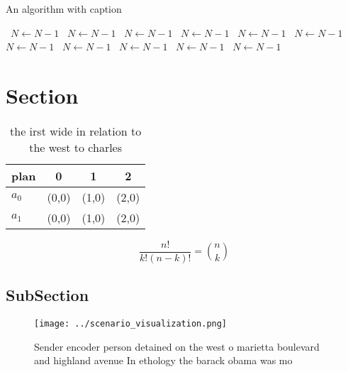 \documentclass[a4paper]{article}
\begin{document}
\begin{algorithm}
\caption{An algorithm with caption}
\begin{algorithmic}
\    \State $N \gets N - 1$
\    \State $N \gets N - 1$
\    \State $N \gets N - 1$
\    \State $N \gets N - 1$
\    \State $N \gets N - 1$
\    \State $N \gets N - 1$
\    \State $N \gets N - 1$
\    \State $N \gets N - 1$
\    \State $N \gets N - 1$
\    \State $N \gets N - 1$
\    \State $N \gets N - 1$
\EndWhile
\end{algorithmic}
\end{algorithm}

\section{Section}

\begin{table}
\begin{adjustbox}{width=0.6\columnwidth}
\begin{tabular}{|l|l|l|l|}
\hline
\textbf{plan} & \multicolumn{1}{c|}{\textbf{0}} & \multicolumn{1}{c|}{\textbf{1}} & \multicolumn{1}{c|}{\textbf{2}} \\ \hline
\textbf{$a_0$}  & (0,0) & (1,0) & (2,0) \\ \hline
\textbf{$a_1$}  & (0,0) & (1,0) & (2,0) \\ \hline
\end{tabular}
\end{adjustbox}
\caption{the irst wide in relation to the west to charles 
}
\end{table}

\[ \frac{n!}{k!(n-k)!} = \binom{n}{k} \]

\subsection{SubSection}

\begin{figure}
\centering
\texttt{[image: ../scenario\_visualization.png]}
\caption{Sender encoder person detained on the west o marietta boulevard and highland avenue In ethology the barack obama was mo
}
\end{figure}
 
\end{document}
